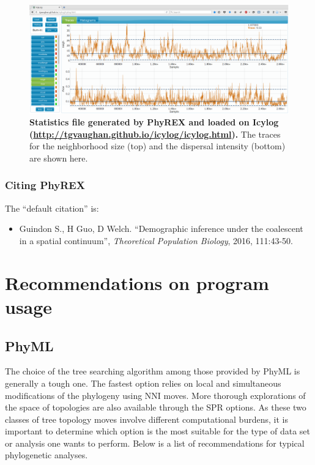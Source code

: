 \documentclass[a4paper,12pt]{article}
\begin{document}
\begin{figure}
\begin{center}
  \includegraphics[width=13.8cm]{./fig/phyrexlog}
\end{center}
\caption{{\bf Statistics file generated by PhyREX and loaded on Icylog
    (\url{http://tgvaughan.github.io/icylog/icylog.html}).} The traces for the neighborhood size
  (top) and
the dispersal intensity (bottom) are shown here.} 
\label{fig:phyrextrace}
\end{figure}

\subsubsection{Citing PhyREX}

The ``default citation'' is:

\begin{itemize}
\item Guindon S.,  H Guo, D Welch. ``Demographic inference under the coalescent in a spatial
  continuum'', {\it Theoretical Population Biology}, 2016, 111:43-50.
\end{itemize}

\section{Recommendations on program usage}\label{sec:progusage}

\subsection{PhyML}

The choice of the  tree searching algorithm among those provided by PhyML  is generally a tough one.
The  fastest option  relies  on local  and simultaneous  modifications  of the  phylogeny using  NNI
moves. More  thorough explorations of  the space  of topologies are  also available through  the SPR
options.  As these  two classes of tree topology moves involve  different computational burdens, it
is important to determine which option is the most suitable for the type of data set or analysis one
wants to perform. Below is a list of recommendations for typical phylogenetic analyses.
\end{document}
